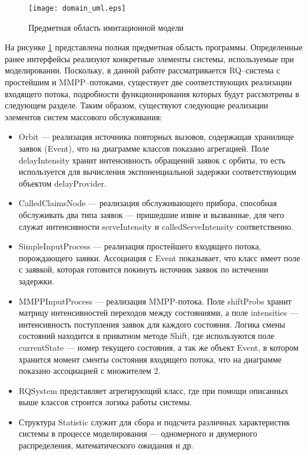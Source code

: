\begin{figure}[H]
	\centering
	\texttt{[image: domain\_uml.eps]}
	\caption{Предметная область имитационной модели}
	\label{domain_uml}
\end{figure}
На рисунке \ref{domain_uml} представлена полная предметная область программы. Определенные ранее интерфейсы реализуют конкретные элементы системы, используемые при моделировании. Поскольку, в данной работе рассматривается RQ--система с простейшим и MMPP--потоками, существует две соответствующих реализации входящего потока, подробности функционирования которых будут рассмотрены в следующем разделе. Таким образом, существуют следующие реализации элементов систем массового обслуживания:
\begin{itemize}
	\item Orbit --- реализация источника повторных вызовов, содержащая хранилище заявок (Event), что на диаграмме классов показано агрегацией. Поле delayIntensity хранит интенсивность обращений заявок с орбиты, то есть используется для вычисления экспоненциальной задержки соответствующим объектом delayProvider.
	\item CalledClaimsNode --- реализация обслуживающего прибора, способная обслуживать два типа заявок --- пришедшие извне и вызванные, для чего служат интенсивности serveIntensity и calledServeIntensity соответственно.
	\item SimpleInputProcess --- реализация простейшего входящего потока, порождающего заявки. Ассоциация с Event показывает, что класс имеет поле с заявкой, которая готовится покинуть источник заявок по истечении задержки.
	\item MMPPInputProcess --- реализация MMPP-потока. Поле shiftProbs хранит матрицу интенсивностей переходов между состояниями, а поле intensities --- интенсивность поступления заявок для каждого состояния. Логика смены состояний находится в приватном методе Shift, где используются поле currentState --- номер текущего состояния, а так же объект Event, в котором хранится момент сменты состояния входящего потока, что на диаграмме показано ассоциацией с множителем 2.
	\item RQSystem представляет агрегирующий класс, где при помощи описанных выше классов строится логика работы системы.
	\item Структура Statistic служит для сбора и подсчета различных характеристик системы в процессе моделирования --- одномерного и двумерного распределения, математического ожидания и др. 
\end{itemize}
\clearpage
